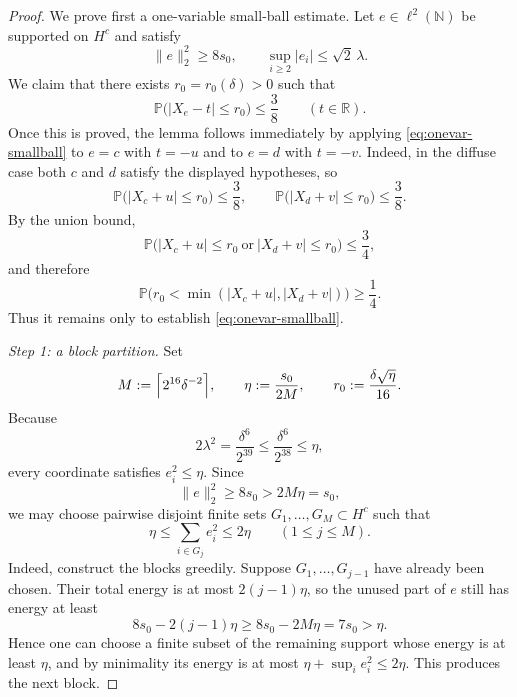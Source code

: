 \documentclass[11pt]{amsart}
\numberwithin{equation}{section}
\theoremstyle{definition}
\theoremstyle{remark}
\newcommand{\Prob}{\mathbb P}
\newcommand{\N}{\mathbb N}
\newcommand{\R}{\mathbb R}
\newcommand{\abs}[1]{\lvert #1 \rvert}
\newcommand{\norm}[1]{\lVert #1 \rVert}
\begin{document}
\begin{proof}
We prove first a one-variable small-ball estimate.  Let $e\in \ell^2(\N)$ be
supported on $H^c$ and satisfy
\[
\norm{e}_2^2\ge 8s_0,
\qquad
\sup_{i\ge2}\abs{e_i}\le \sqrt2\,\lambda.
\]
We claim that there exists $r_0=r_0(\delta)>0$ such that
\begin{equation}\label{eq:onevar-smallball}
\Prob\bigl(\abs{X_e-t}\le r_0\bigr)\le \frac38
\qquad(t\in\R).
\end{equation}
Once this is proved, the lemma follows immediately by applying
\eqref{eq:onevar-smallball} to $e=c$ with $t=-u$ and to $e=d$ with $t=-v$.
Indeed, in the diffuse case both $c$ and $d$ satisfy the displayed
hypotheses, so
\[
\Prob\bigl(\abs{X_c+u}\le r_0\bigr)\le \frac38,
\qquad
\Prob\bigl(\abs{X_d+v}\le r_0\bigr)\le \frac38.
\]
By the union bound,
\[
\Prob\bigl(\abs{X_c+u}\le r_0\ \text{or}\ \abs{X_d+v}\le r_0\bigr)
\le \frac34,
\]
and therefore
\[
\Prob\bigl(r_0<\min(\abs{X_c+u},\abs{X_d+v})\bigr)\ge \frac14.
\]
Thus it remains only to establish \eqref{eq:onevar-smallball}.

\smallskip
\noindent\emph{Step 1: a block partition.}
Set
\[
M:=\Bigl\lceil 2^{16}\delta^{-2}\Bigr\rceil,
\qquad
\eta:=\frac{s_0}{2M},
\qquad
r_0:=\frac{\delta\sqrt{\eta}}{16}.
\]
Because
\[
2\lambda^2=\frac{\delta^6}{2^{39}}
\le \frac{\delta^6}{2^{38}}
\le \eta,
\]
every coordinate satisfies $e_i^2\le \eta$.  Since
\[
\norm{e}_2^2\ge 8s_0>2M\eta=s_0,
\]
we may choose pairwise disjoint finite sets $G_1,\dots,G_M\subset H^c$ such
that
\begin{equation}\label{eq:block-energy}
\eta\le \sum_{i\in G_j} e_i^2\le 2\eta
\qquad(1\le j\le M).
\end{equation}
Indeed, construct the blocks greedily.  Suppose $G_1,\dots,G_{j-1}$ have
already been chosen.  Their total energy is at most $2(j-1)\eta$, so the
unused part of $e$ still has energy at least
\[
8s_0-2(j-1)\eta\ge 8s_0-2M\eta=7s_0> \eta.
\]
Hence one can choose a finite subset of the remaining support whose energy is
at least $\eta$, and by minimality its energy is at most $\eta+\sup_i e_i^2
\le 2\eta$.  This produces the next block.


\end{proof}
\end{document}
